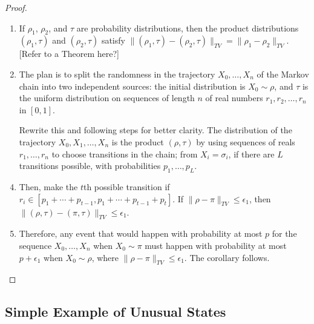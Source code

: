 \documentclass[12pt]{article}
\begin{document}
\begin{proof}
    \begin{enumerate}
        \item
            If \( \rho_1 \), \( \rho_{2} \), and \( \tau \) are
            probability distributions, then the product distributions \(
            (\rho_1 , \tau ) \) and \( (\rho_2 , \tau ) \) satisfy \( \|
            (\rho_1 , \tau )- (\rho_2, \tau )\|_{TV} = \|\rho_1- \rho_2
            \|_{TV} \). [Refer to a Theorem here?]
        \item
            The plan is to split the randomness in the trajectory \( X_0,
            \dots , X_n \) of the Markov chain into two independent
            sources:  the initial distribution is \( X_0 \sim \rho \),
            and \( \tau \) is the uniform distribution on sequences of
            length \( n \) of real numbers \( r_1 , r_2, \dots, r_n \)
            in \( [0, 1] \).
        \item [Rewrite this and following steps for better clarity.]
            The distribution of the trajectory \( X_0 , X_1,\dots, X_n \)
            is the product \( (\rho, \tau ) \) by using sequences of
            reals \( r_1, \dots, r_n \) to choose transitions in the
            chain; from \( X_i = \sigma_i \), if there are \( L \)
            transitions possible, with probabilities \( p_1, \dots, p_L \).
        \item
            Then, make the \( t \)th possible transition if \( r_i \in [p_1
            + \cdots + p_{t-1}, p_1 + \cdots + p_{t-1 }+ p_t] \).  If \(
            \|\rho- \pi\|_{TV} \le \epsilon_1 \), then \( \|(\rho, \tau
            )- (\pi, \tau )\|_{TV} \le \epsilon_1 \).
        \item
            Therefore, any event that would happen with probability at
            most \( p \) for the sequence \( X_0 ,\dots, X_n \) when \(
            X_0 \sim \pi \) must happen with probability at most \( p +
            \epsilon_1 \) when \( X_0 \sim \rho \), where \( \|\rho- \pi\|_
            {TV} \le \epsilon_1 \).  The corollary follows.
    \end{enumerate}
\end{proof}

\subsection*{Simple Example of Unusual States}
\end{document}
